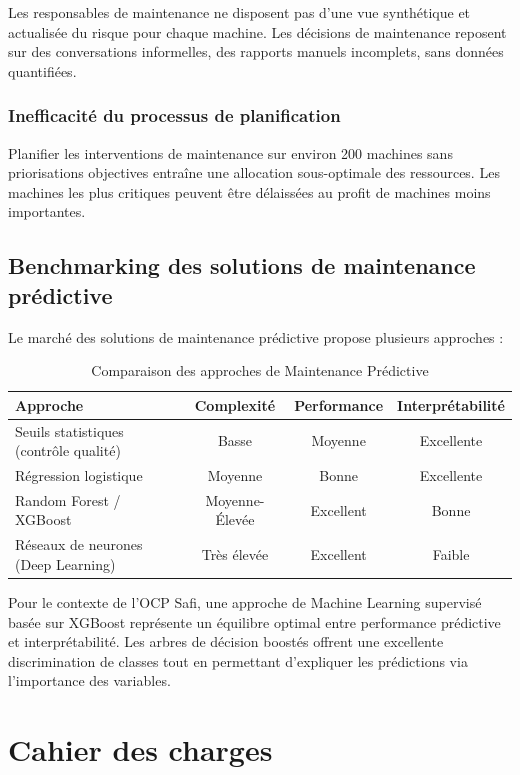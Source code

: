 \documentclass[a4paper,12pt,twoside]{report}
\begin{document}
Les responsables de maintenance ne disposent pas d'une vue synthétique et actualisée du risque pour chaque machine. Les décisions de maintenance reposent sur des conversations informelles, des rapports manuels incomplets, sans données quantifiées.

\subsection{Inefficacité du processus de planification}

Planifier les interventions de maintenance sur environ 200 machines sans priorisations objectives entraîne une allocation sous-optimale des ressources. Les machines les plus critiques peuvent être délaissées au profit de machines moins importantes.

\section{Benchmarking des solutions de maintenance prédictive}

Le marché des solutions de maintenance prédictive propose plusieurs approches :

\begin{table}[H]
\centering
\small
\caption{Comparaison des approches de Maintenance Prédictive}
\begin{tabular}{|l|c|c|c|}
\hline
\textbf{Approche} & \textbf{Complexité} & \textbf{Performance} & \textbf{Interprétabilité} \\
\hline\hline
Seuils statistiques (contrôle qualité) & Basse & Moyenne & Excellente \\
\hline
Régression logistique & Moyenne & Bonne & Excellente \\
\hline
Random Forest / XGBoost & Moyenne-Élevée & Excellent & Bonne \\
\hline
Réseaux de neurones (Deep Learning) & Très élevée & Excellent & Faible \\
\hline
\end{tabular}
\end{table}

Pour le contexte de l'OCP Safi, une approche de Machine Learning supervisé basée sur XGBoost représente un équilibre optimal entre performance prédictive et interprétabilité. Les arbres de décision boostés offrent une excellente discrimination de classes tout en permettant d'expliquer les prédictions via l'importance des variables.

\chapter{Cahier des charges}
\end{document}
